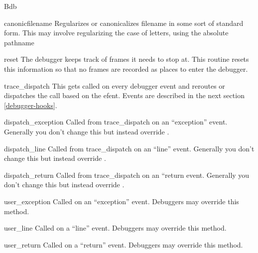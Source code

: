 \begin{classdesc}{Bdb}{}\label{Bdb}

\begin{methoddesc}{canonic}{filename}
  Regularizes or canonicalizes filename in some sort of standard
  form. This may involve regularizing the case of letters, using
  the absolute pathname
\end{methoddesc}

\begin{methoddesc}{reset}{}
  The debugger keeps track of frames it needs to stop at. This routine
  resets this information so that no frames are recorded as places to
  enter the debugger.
\end{methoddesc}

\begin{methoddesc}{trace_dispatch}{}
  This gets called on every debugger event and reroutes or dispatches
  the call based on the efent. Events are described in the next
  section \ref{debugger-hooks}.  
\end{methoddesc}

\begin{methoddesc}{dispatch_exception}{}
  Called from trace_dispatch on an ``exception'' event. Generally you
  don't change this but instead override .
\end{methoddesc}

\begin{methoddesc}{dispatch_line}{}
  Called from trace_dispatch on an ``line'' event. Generally you
  don't change this but instead override .
\end{methoddesc}

\begin{methoddesc}{dispatch_return}{}
  Called from trace_dispatch on an ``return event. Generally you
  don't change this but instead override .
\end{methoddesc}

\begin{methoddesc}{user_exception}{}
  Called on an ``exception'' event. Debuggers may override this method.
\end{methoddesc}

\begin{methoddesc}{user_line}{}
  Called on a ``line'' event. Debuggers may override this method.
\end{methoddesc}

\begin{methoddesc}{user_return}{}
  Called on a ``return'' event. Debuggers may override this method.
\end{methoddesc}

\end{classdesc}

